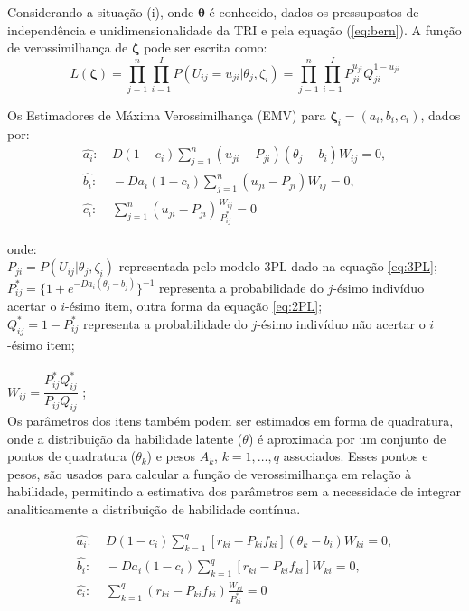 Considerando a situação (i), onde $ \boldsymbol{\theta} $ é conhecido, dados os pressupostos de independência e unidimensionalidade da TRI e pela equação (\ref{eq:bern}). A função de verossimilhança de  $ \boldsymbol{\zeta} $ pode ser escrita como:
\[
L(\boldsymbol{\zeta}) =  \prod_{j=1}^{n}\prod_{i=1}^{I}P(U_{ij} = u_{ji}|\theta_j, \zeta_i) = \prod_{j=1}^{n}\prod_{i=1}^{I}P_{ji}^{u_{ji}}Q_{ji}^{1-u_{ji}}
\]

Os Estimadores de Máxima Verossimilhança (EMV) para $ \boldsymbol{\zeta}_i = (a_i, b_i , c_i )$, dados por:\\


\[
\begin{aligned}
	\hat{a_i}: & \ D(1 - c_i)\sum_{j=1}^{n}(u_{ji} - P_{ji})(\theta_j - b_i)W_{ij} = 0, \\
	\hat{b_i}: & \ -Da_i(1 - c_i)\sum_{j=1}^{n}(u_{ji} - P_{ji})W_{ij} = 0, \\
	\hat{c_i}: & \ \sum_{j=1}^{n}(u_{ji} - P_{ji})\frac{W_{ij}}{P^*_{ij}} = 0
\end{aligned}
\]

\noindent onde:\\

\noindent $P_{ji} = P(U_{ij}|\theta_j,\zeta_i)$ representada pelo modelo 3PL dado na equação \ref{eq:3PL};\\

\noindent $P^*_{ij} = \{1 + e^{-Da_i(\theta_j - b_j)}\}^{-1} $ representa a probabilidade do $j$-ésimo indivíduo acertar o $i$-ésimo item, outra forma da equação \ref{eq:2PL};\\

\noindent $Q^*_{ij} = 1 - P^*_{ij} $ representa a probabilidade do $j$-ésimo indivíduo não acertar o $i$-ésimo item;\\
\\
\noindent $W_{ij} = \dfrac{P^*_{ij}Q^*_{ij}}{P_{ij}Q_{ij}} $ ;\\

Os parâmetros dos itens também podem ser estimados em forma de quadratura, onde a distribuição da habilidade latente ($\theta$) é aproximada por um conjunto de pontos de quadratura ($\theta_k$)  e pesos $A_k$, $k = 1, \dots, q$ associados. Esses pontos e pesos,  são usados para calcular a função de verossimilhança em relação à habilidade, permitindo a estimativa dos parâmetros sem a necessidade de integrar analiticamente a distribuição de habilidade contínua.

\[
\begin{aligned}
	\hat{a_i}: & \ D(1 - c_i)\sum_{k=1}^{q}[r_{ki} - P_{ki}f_{ki}](\theta_k - b_i)W_{ki} = 0, \\
	\hat{b_i}: & \ -Da_i(1 - c_i)\sum_{k=1}^{q}\left[r_{ki} - P_{ki}f_{ki}\right]W_{ki} = 0, \\
	\hat{c_i}: & \ \sum_{k=1}^{q}(r_{ki} - P_{ki}f_{ki})\frac{W_{ki}}{P^*_{ki}} = 0
\end{aligned}
\]



